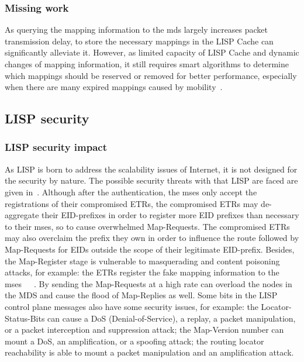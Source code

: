 \subsubsection{Missing work}
\label{subsubsec:cache_missing}
As querying the mapping information to the \acrshort{mds} largely increases packet transmission delay, to store the necessary mappings in the LISP Cache can significantly alleviate it. However, as limited capacity of LISP Cache and dynamic changes of mapping information, it still requires smart algorithms to determine which mappings should be reserved or removed for better performance, especially when there are many expired mappings caused by mobility~\cite{feng2017locator}.


\subsection{LISP security}
\label{subsec:security}

\subsubsection{LISP security impact}
\label{subsubsec:security_impact}
As LISP is born to address the scalability issues of Internet, it is not designed for the security by nature. The possible security threats with that LISP are faced are given in~\cite{rfc7835}. Although after the authentication, the \acrshort{ms}es only accept the registrations of their compromised ETRs, the compromised ETRs may de-aggregate their EID-prefixes in order to register more EID prefixes than necessary to their \acrshort{ms}es, so to cause overwhelmed Map-Requests. The compromised ETRs may also overclaim the prefix they own in order to influence the route followed by Map-Requests for EIDs outside the scope of their legitimate EID-prefix. Besides, the Map-Register stage is vulnerable to masquerading and content poisoning attacks, for example: the ETRs register the fake mapping information to the \acrshort{ms}es~\cite{aiash2013securing}~\cite{montero2013securing}~\cite{aiash2013novel}. By sending the Map-Requests at a high rate can overload the nodes in the MDS and cause the flood of Map-Replies as well. Some bits in the LISP control plane messages also have some security issues, for example: the Locator-Status-Bits can cause a DoS (Denial-of-Service), a replay, a packet manipulation, or a packet interception and suppression attack; the Map-Version number can mount a DoS, an amplification, or a spoofing attack; the routing locator reachability is able to mount a packet manipulation and an amplification attack.

